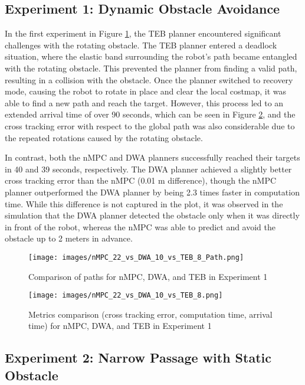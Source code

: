 \documentclass[conference]{IEEEtran}
\begin{document}
\subsection{Experiment 1: Dynamic Obstacle Avoidance}

In the first experiment in Figure \ref{fig:nMPC_22_vs_DWA_12_vs_TEB_6_Path}, the TEB planner encountered significant challenges with the rotating obstacle. The TEB planner entered a deadlock situation, where the elastic band surrounding the robot's path became entangled with the rotating obstacle. This prevented the planner from finding a valid path, resulting in a collision with the obstacle. Once the planner switched to recovery mode, causing the robot to rotate in place and clear the local costmap, it was able to find a new path and reach the target. However, this process led to an extended arrival time of over 90 seconds, which can be seen in Figure \ref{fig:nMPC_22_vs_DWA_12_vs_TEB_6}, and the cross tracking error with respect to the global path was also considerable due to the repeated rotations caused by the rotating obstacle.

In contrast, both the nMPC and DWA planners successfully reached their targets in 40 and 39 seconds, respectively. The DWA planner achieved a slightly better cross tracking error than the nMPC (0.01 m difference), though the nMPC planner outperformed the DWA planner by being 2.3 times faster in computation time. While this difference is not captured in the plot, it was observed in the simulation that the DWA planner detected the obstacle only when it was directly in front of the robot, whereas the nMPC was able to predict and avoid the obstacle up to 2 meters in advance.

\begin{figure}[!h]
    \centering
    \texttt{[image: images/nMPC\_22\_vs\_DWA\_10\_vs\_TEB\_8\_Path.png]}
    \caption{Comparison of paths for nMPC, DWA, and TEB in Experiment 1}
    \label{fig:nMPC_22_vs_DWA_12_vs_TEB_6_Path}
\end{figure}

\begin{figure}[!h]
    \centering
    \texttt{[image: images/nMPC\_22\_vs\_DWA\_10\_vs\_TEB\_8.png]}
    \caption{Metrics comparison (cross tracking error, computation time, arrival time) for nMPC, DWA, and TEB in Experiment 1}
    \label{fig:nMPC_22_vs_DWA_12_vs_TEB_6}
\end{figure}

\subsection{Experiment 2: Narrow Passage with Static Obstacle}
\end{document}
